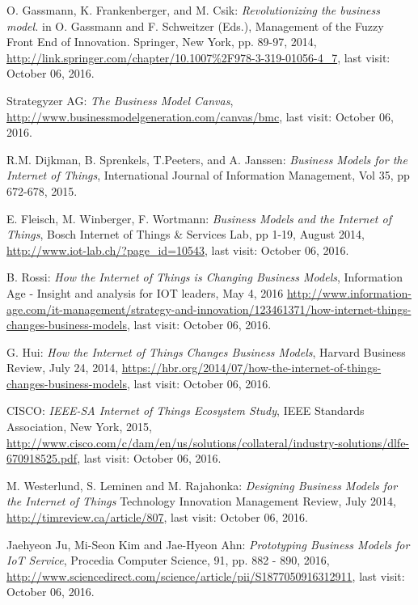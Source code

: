 	 \begin{thebibliography}{99}
 		  O. Gassmann, K. Frankenberger, and M. Csik: \emph{Revolutionizing the business model.} in O. Gassmann and F. Schweitzer (Eds.), Management of the Fuzzy Front End of Innovation. Springer, New York, pp. 89-97, 2014, \url{http://link.springer.com/chapter/10.1007%2F978-3-319-01056-4_7}, last visit: October 06, 2016.

 		  Strategyzer AG: \emph{The Business Model Canvas}, \url{http://www.businessmodelgeneration.com/canvas/bmc}, last visit: October 06, 2016.

 		  R.M. Dijkman, B. Sprenkels, T.Peeters, and A. Janssen: \emph{Business Models for the Internet of Things}, International Journal of Information Management, Vol 35, pp 672-678, 2015.

 		  E. Fleisch, M. Winberger, F. Wortmann: \emph{Business Models and the Internet of Things}, Bosch Internet of Things \& Services Lab, pp 1-19, August 2014, \url{http://www.iot-lab.ch/?page_id=10543}, last visit: October 06, 2016.

 		  B. Rossi: \emph{How the Internet of Things is Changing Business Models}, Information Age - Insight and analysis for IOT leaders, May 4, 2016 \url{http://www.information-age.com/it-management/strategy-and-innovation/123461371/how-internet-things-changes-business-models}, last visit: October 06, 2016.

 		  G. Hui: \emph{How the Internet of Things Changes Business Models}, Harvard Business Review, July 24, 2014, \url{https://hbr.org/2014/07/how-the-internet-of-things-changes-business-models}, last visit: October 06, 2016.

 		  CISCO: \emph{IEEE-SA Internet of Things Ecosystem Study}, IEEE Standards Association, New York, 2015, \url{http://www.cisco.com/c/dam/en/us/solutions/collateral/industry-solutions/dlfe-670918525.pdf}, last visit: October 06, 2016.

 		 M. Westerlund, S. Leminen and M. Rajahonka: \emph{Designing Business Models for the Internet of Things} Technology Innovation Management Review, July 2014, \url{http://timreview.ca/article/807}, last visit: October 06, 2016.

 		 Jaehyeon Ju, Mi-Seon Kim and Jae-Hyeon Ahn: \emph{Prototyping Business Models for IoT Service}, Procedia Computer Science, 91, pp. 882 - 890, 2016, \url{http://www.sciencedirect.com/science/article/pii/S1877050916312911}, last visit: October 06, 2016.
	 \end{thebibliography}


